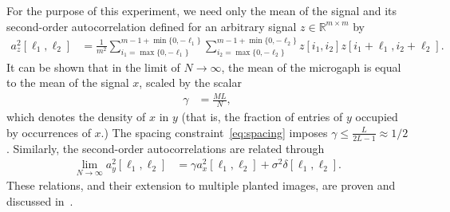 \documentclass[english,11pt]{article}
\newcommand{\1}{\mathbf{1}}
\newcommand{\TODO}[1]{{\color{red}{[#1]}}}
\numberwithin{equation}{section}
\theoremstyle{plain}
\theoremstyle{definition}
\theoremstyle{remark}
\theoremstyle{plain}
\theoremstyle{remark}
\theoremstyle{plain}
\theoremstyle{plain}
\begin{document}
%
For the purpose of this experiment, we need only the mean of the signal and its second-order autocorrelation defined for an arbitrary signal $z\in\mathbb{R}^{m\times m}$ by \TODO{to verify}
 \begin{align} 
 a_z^2[\ell_1,\ell_2] & = \frac{1}{m^2} \sum_{i_1 = \max\{0, -\ell_1\}}^{m-1 + \min\{0, -\ell_1\}} \sum_{i_2 = \max\{0, -\ell_2\}}^{m-1 + \min\{0, -\ell_2\}}z[i_1,i_2]z[i_1+\ell_1,i_2+\ell_2]. 
 \end{align}
 It can be shown that in the limit of $N\to\infty$,  the mean of the microgaph is equal to the mean of the signal $x$, scaled by the scalar 
 \begin{align}
 \gamma & = \frac{M L}{N},
 \end{align}
 which denotes the density of $x$ in $y$ (that is, the fraction of entries of $y$ occupied by occurrences of $x$.) The spacing constraint~\eqref{eq:spacing} imposes $\gamma\leq\frac{L}{2L-1}\approx 1/2$.
 Similarly, the second-order autocorrelations are related through 
 \begin{align*}
	\lim_{N\to\infty} a_y^2[\ell_1,\ell_2] & = \gamma a_{x}^2[\ell_1,\ell_2] + \sigma^2\delta[\ell_1,\ell_2].
 \end{align*}
 These relations, and their extension to multiple planted images, are proven and discussed in~\cite{bendory2018estimation}. 
 
\end{document}
